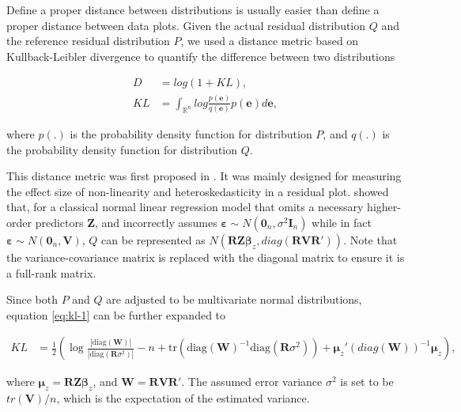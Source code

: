 \documentclass[]{interact}
\theoremstyle{plain}%
\theoremstyle{definition}
\theoremstyle{remark}
\begin{document}
Define a proper distance between distributions is usually easier than
define a proper distance between data plots. Given the actual residual
distribution \(Q\) and the reference residual distribution \(P\), we
used a distance metric based on Kullback-Leibler divergence
\citep{kullback1951information} to quantify the difference between two
distributions

\begin{align}
\label{eq:kl-0}
D &= log\left(1 + KL\right), \\
\label{eq:kl-1}
KL &= \int_{\mathbb{R}^{n}}log\frac{p(\boldsymbol{e})}{q(\boldsymbol{e})}p(\boldsymbol{e})d\boldsymbol{e},
\end{align}

\noindent where \(p(.)\) is the probability density function for
distribution \(P\), and \(q(.)\) is the probability density function for
distribution \(Q\).

This distance metric was first proposed in \citet{li2023plot}. It was
mainly designed for measuring the effect size of non-linearity and
heteroskedasticity in a residual plot. \citet{li2023plot} showed that,
for a classical normal linear regression model that omits a necessary
higher-order predictors \(\boldsymbol{Z}\), and incorrectly assumes
\(\boldsymbol{\varepsilon} \sim N(\boldsymbol{0}_n,\sigma^2\boldsymbol{I}_n)\)
while in fact
\(\boldsymbol{\varepsilon} \sim N(\boldsymbol{0}_n, \boldsymbol{V})\),
\(Q\) can be represented as
\(N(\boldsymbol{R}\boldsymbol{Z}\boldsymbol{\beta}_z, diag(\boldsymbol{R}\boldsymbol{V}\boldsymbol{R}'))\).
Note that the variance-covariance matrix is replaced with the diagonal
matrix to ensure it is a full-rank matrix.

Since both \(P\) and \(Q\) are adjusted to be multivariate normal
distributions, equation \ref{eq:kl-1} can be further expanded to

\begin{align}
\label{eq:kl-2}
KL &= \frac{1}{2}\left(\log\frac{|\text{diag}(\boldsymbol{W})|}{|\text{diag}(\boldsymbol{R}\sigma^2)|} - n + \text{tr}(\text{diag}(\boldsymbol{W})^{-1}\text{diag}(\boldsymbol{R}\sigma^2)) + \boldsymbol{\mu}_z'(diag(\boldsymbol{W}))^{-1}\boldsymbol{\mu}_z\right),
\end{align}

\noindent where
\(\boldsymbol{\mu}_z = \boldsymbol{R}\boldsymbol{Z}\boldsymbol{\beta}_z\),
and \(\boldsymbol{W} = \boldsymbol{R}\boldsymbol{V}\boldsymbol{R}'\).
The assumed error variance \(\sigma^2\) is set to be
\(tr(\boldsymbol{V})/n\), which is the expectation of the estimated
variance.
\end{document}
